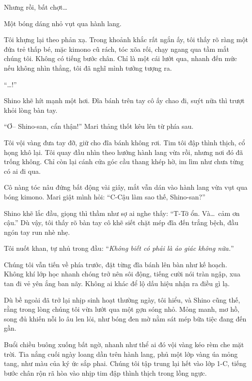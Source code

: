 \documentclass[../main.tex]{subfiles}
\begin{document}
Nhưng rồi, bất chợt\dots

Một bóng dáng nhỏ vụt qua hành lang.

Tôi khựng lại theo phản xạ. Trong khoảnh khắc rất ngắn ấy, tôi thấy rõ ràng một đứa trẻ thấp bé, mặc kimono cũ rách, tóc xõa rối, chạy ngang qua tầm mắt chúng tôi. Không có tiếng bước chân. Chỉ là một cái lướt qua, nhanh đến mức nếu không nhìn thẳng, tôi đã nghĩ mình tưởng tượng ra.

``\dots!''

Shino khẽ hít mạnh một hơi. Đĩa bánh trên tay cô ấy chao đi, suýt nữa thì trượt khỏi lòng bàn tay.

``Ơ-- Shino-san, cẩn thận!'' Mari thảng thốt kêu lên từ phía sau.

Tôi vội vàng đưa tay đỡ, giữ cho đĩa bánh không rơi. Tim tôi đập thình thịch, cổ họng khô lại. Tôi quay đầu nhìn theo hướng hành lang vừa rồi, nhưng nơi đó đã trống không. Chỉ còn lại cánh cửa góc cầu thang khép hờ, im lìm như chưa từng có ai đi qua.

Cô nàng tóc nâu đứng bất động vài giây, mắt vẫn dán vào hành lang vừa vụt qua bóng kimono. Mari giật mình hỏi: ``C-Cậu làm sao thế, Shino-san?''

Shino khẽ lắc đầu, giọng thì thầm như sợ ai nghe thấy: ``T-Tớ ổn. Và\dots\ cảm ơn cậu.'' Dù vậy, tôi thấy rõ bàn tay cô khẽ siết chặt mép đĩa đến trắng bệch, đầu ngón tay run nhè nhẹ.

Tôi nuốt khan, tự nhủ trong đầu: ``\textit{Không biết có phải là ảo giác không nữa.}''

Chúng tôi vẫn tiến về phía trước, đặt từng đĩa bánh lên bàn như kế hoạch. Không khí lớp học nhanh chóng trở nên sôi động, tiếng cười nói tràn ngập, xua tan đi vẻ yên ắng ban nãy. Không ai khác để lộ dấu hiệu nhận ra điều gì lạ.

Dù bề ngoài đã trở lại nhịp sinh hoạt thường ngày, tôi hiểu, và Shino cũng thế, rằng trong lòng chúng tôi vừa lướt qua một gợn sóng nhỏ. Mỏng manh, mơ hồ, song đủ khiến nỗi lo âu len lỏi, như bóng đen mờ nằm sát mép bữa tiệc đang đến gần.


\ct

Buổi chiều buông xuống bất ngờ, nhanh như thể ai đó vội vàng kéo rèm che mặt trời. Tia nắng cuối ngày loang dần trên hành lang, phủ một lớp vàng úa mỏng tang, như màu của ký ức sắp phai. Chúng tôi tập trung lại hết vào lớp 1-C, tiếng bước chân rộn rã hòa vào nhịp tim đập thình thịch trong lồng ngực.
\end{document}
